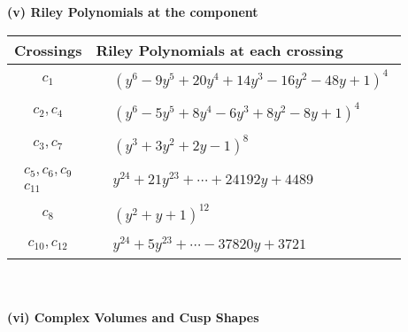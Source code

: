 \documentclass[1p]{elsarticle_modified}
\theoremstyle{definition}
\begin{document}
\newpage\renewcommand{\arraystretch}{1}
\flushleft \textbf{(v) Riley Polynomials at the component}\newline \\
\begin{tabular}{m{50pt}|m{274pt}}
Crossings & \hspace{64pt}Riley Polynomials at each crossing \\
\hline $$\begin{aligned}c_{1}\end{aligned}$$&$\begin{aligned}
&(y^6-9 y^5+20 y^4+14 y^3-16 y^2-48 y+1)^4
\end{aligned}$\\
\hline $$\begin{aligned}c_{2},c_{4}\end{aligned}$$&$\begin{aligned}
&(y^6-5 y^5+8 y^4-6 y^3+8 y^2-8 y+1)^4
\end{aligned}$\\
\hline $$\begin{aligned}c_{3},c_{7}\end{aligned}$$&$\begin{aligned}
&(y^3+3 y^2+2 y-1)^8
\end{aligned}$\\
\hline $$\begin{aligned}c_{5},c_{6},c_{9}\\c_{11}\end{aligned}$$&$\begin{aligned}
&y^{24}+21 y^{23}+\cdots+24192 y+4489
\end{aligned}$\\
\hline $$\begin{aligned}c_{8}\end{aligned}$$&$\begin{aligned}
&(y^2+y+1)^{12}
\end{aligned}$\\
\hline $$\begin{aligned}c_{10},c_{12}\end{aligned}$$&$\begin{aligned}
&y^{24}+5 y^{23}+\cdots-37820 y+3721
\end{aligned}$\\
\hline
\end{tabular}\\~\\
\newpage\flushleft \textbf{(vi) Complex Volumes and Cusp Shapes}
\end{document}
